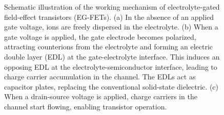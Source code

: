 \begin{figure}[ht]
    \centering
    \caption{Schematic illustration of the working mechanism of electrolyte-gated field-effect transistors (EG-FETs).
    (a) In the absence of an applied gate voltage, ions are freely dispersed in the electrolyte.
    (b) When a gate voltage is applied, the gate electrode becomes polarized, attracting counterions from the electrolyte and forming an electric double layer (EDL) at the gate-electrolyte interface. This induces an opposing EDL at the electrolyte-semiconductor interface, leading to charge carrier accumulation in the channel. The EDLs act as capacitor plates, replacing the conventional solid-state dielectric.
    (c) When a drain-source voltage is applied, charge carriers in the channel start flowing, enabling transistor operation.}
    \label{fig:EDL}
\end{figure}

